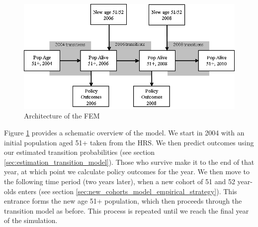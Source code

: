 \begin{figure}[h]
\centering
\includegraphics[scale=0.8]{./img/fem_architecture.png}
\caption{Architecture of the FEM}
\label{fig:fem_architecture} 
\end{figure}

Figure \ref{fig:fem_architecture} provides a schematic overview of the model. We start in 2004 with 
an initial population aged 51+ taken from the HRS. We then predict outcomes using our estimated 
transition probabilities (see section \ref{sec:estimation_transition_model}). Those who survive make it to the end of that year, at 
which point we calculate policy outcomes for the year. We then move to the following time period 
(two years later), when a new cohort of 51 and 52 year-olds enters (see section \ref{sec:new_cohorts_model_empirical_strategy}). This entrance 
forms the new age 51+ population, which then proceeds through the transition model as before. This 
process is repeated until we reach the final year of the simulation. 
